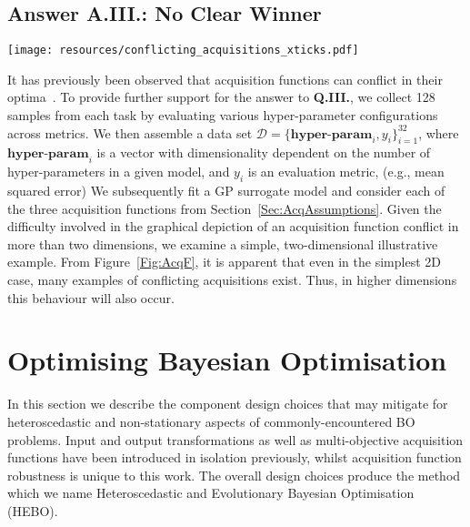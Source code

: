 \documentclass[jair,twoside,11pt,theapa]{article}
\let\cite\shortcite
\theoremstyle{definition}
\begin{document}
\subsection{Answer A.III.: No Clear Winner}\label{Sec:AnswerQ3}
\begin{figure*}
    \centering
\texttt{[image: resources/conflicting\_acquisitions\_xticks.pdf]}
    \caption{Examples depicting conflicting acquisitions across data sets (Wine, Boston Housing, and Iris) and models (AdaBoost, Multilayer perceptron, K-Nearest neighbours, and support vector machines). The y-axis shows the acquisition value, and x-axis a given configuration of hyperparameters. Clearly, in these examples, not only different acquisitions lead to different optima, but it can be seen that such solutions might conflict (minimum value for one acquisition function is a maximum value for another acquisition function).}
    \label{Fig:AcqF}
\end{figure*}
It has previously been observed that acquisition functions can conflict in their optima~\cite{2014_Shahriari}. To provide further support for the answer to \textbf{Q.III.}, we collect 128 samples from each task by evaluating various hyper-parameter configurations across metrics. We then assemble a data set $\mathcal{D} = \{\textbf{hyper-param}_i, y_i\}_{i=1}^{32}$, where $\textbf{hyper-param}_i$ is a vector with dimensionality dependent on the number of hyper-parameters in a given model, and $y_i$ is an evaluation metric, (e.g., mean squared error) We subsequently fit a GP surrogate model and consider each of the three acquisition functions from Section~\ref{Sec:AcqAssumptions}. Given the difficulty involved in the graphical depiction of an acquisition function conflict in more than two dimensions, we examine a simple, two-dimensional illustrative example.
From Figure~\ref{Fig:AcqF}, it is apparent that even in the simplest 2D case, many examples of conflicting acquisitions exist. Thus, in higher dimensions this behaviour will also occur. 


\section{Optimising Bayesian Optimisation}\label{Sec:Improve}
In this section we describe the component design choices that may mitigate for heteroscedastic and non-stationary aspects of commonly-encountered BO problems. Input and output transformations as well as multi-objective acquisition functions have been introduced in isolation previously, whilst acquisition function robustness is unique to this work. The overall design choices produce the method which we name Heteroscedastic and Evolutionary Bayesian Optimisation (HEBO).
\end{document}
